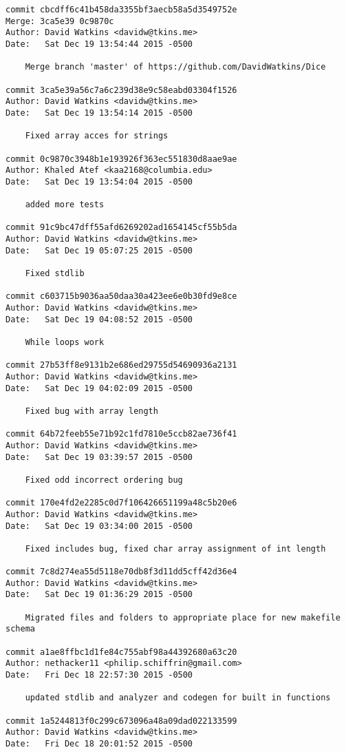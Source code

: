 \begin{verbatim}
commit cbcdff6c41b458da3355bf3aecb58a5d3549752e
Merge: 3ca5e39 0c9870c
Author: David Watkins <davidw@tkins.me>
Date:   Sat Dec 19 13:54:44 2015 -0500

    Merge branch 'master' of https://github.com/DavidWatkins/Dice

commit 3ca5e39a56c7a6c239d38e9c58eabd03304f1526
Author: David Watkins <davidw@tkins.me>
Date:   Sat Dec 19 13:54:14 2015 -0500

    Fixed array acces for strings

commit 0c9870c3948b1e193926f363ec551830d8aae9ae
Author: Khaled Atef <kaa2168@columbia.edu>
Date:   Sat Dec 19 13:54:04 2015 -0500

    added more tests

commit 91c9bc47dff55afd6269202ad1654145cf55b5da
Author: David Watkins <davidw@tkins.me>
Date:   Sat Dec 19 05:07:25 2015 -0500

    Fixed stdlib

commit c603715b9036aa50daa30a423ee6e0b30fd9e8ce
Author: David Watkins <davidw@tkins.me>
Date:   Sat Dec 19 04:08:52 2015 -0500

    While loops work

commit 27b53ff8e9131b2e686ed29755d54690936a2131
Author: David Watkins <davidw@tkins.me>
Date:   Sat Dec 19 04:02:09 2015 -0500

    Fixed bug with array length

commit 64b72feeb55e71b92c1fd7810e5ccb82ae736f41
Author: David Watkins <davidw@tkins.me>
Date:   Sat Dec 19 03:39:57 2015 -0500

    Fixed odd incorrect ordering bug

commit 170e4fd2e2285c0d7f106426651199a48c5b20e6
Author: David Watkins <davidw@tkins.me>
Date:   Sat Dec 19 03:34:00 2015 -0500

    Fixed includes bug, fixed char array assignment of int length

commit 7c8d274ea55d5118e70db8f3d11dd5cff42d36e4
Author: David Watkins <davidw@tkins.me>
Date:   Sat Dec 19 01:36:29 2015 -0500

    Migrated files and folders to appropriate place for new makefile schema

commit a1ae8ffbc1d1fe84c755abf98a44392680a63c20
Author: nethacker11 <philip.schiffrin@gmail.com>
Date:   Fri Dec 18 22:57:30 2015 -0500

    updated stdlib and analyzer and codegen for built in functions

commit 1a5244813f0c299c673096a48a09dad022133599
Author: David Watkins <davidw@tkins.me>
Date:   Fri Dec 18 20:01:52 2015 -0500


\end{verbatim}
